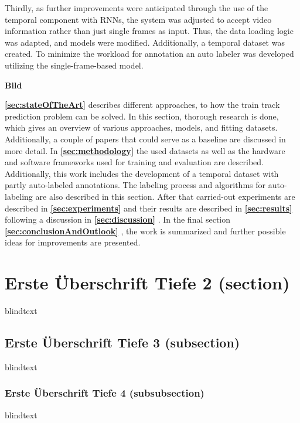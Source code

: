 Thirdly, as further improvements were anticipated through the use of the temporal component with RNNs, the system was adjusted to accept video information rather than just single frames as input.
Thus, the data loading logic was adapted, and models were modified.
Additionally, a temporal dataset was created.
To minimize the workload for annotation an auto labeler was developed utilizing the single-frame-based model.

\vspace{2cm} %

\textbf{Bild}

\vspace{2cm} %

\textbf{\ref{sec:stateOfTheArt}} \textbf{} describes different approaches, to how the train track prediction problem can be solved.
In this section, thorough research is done, which gives an overview of various approaches, models, and fitting datasets.
Additionally, a couple of papers that could serve as a baseline are discussed in more detail.
In \textbf{\ref{sec:methodology}} \textbf{} the used datasets as well as the hardware and software frameworks used for training and evaluation are described.
Additionally, this work includes the development of a temporal dataset with partly auto-labeled annotations.
The labeling process and algorithms for auto-labeling are also described in this section.
After that carried-out experiments are described in \textbf{\ref{sec:experiments}} \textbf{} and their results are described in \textbf{\ref{sec:results}} \textbf{} following a discussion in \textbf{\ref{sec:discussion}} \textbf{}.
In the final section \textbf{\ref{sec:conclusionAndOutlook}} \textbf{}, the work is summarized and further possible ideas for improvements are presented.

\section{Erste Überschrift Tiefe 2 (section)}
blindtext

\subsection{Erste Überschrift Tiefe 3 (subsection)}
blindtext

\subsubsection{Erste Überschrift Tiefe 4 (subsubsection)}
blindtext
\cite{orf2024toetlicherZugunfall}